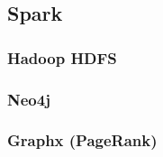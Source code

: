 \subsection{Spark}
\label{sec:spark}

\subsubsection{Hadoop HDFS}
\label{sec:hadoop HDFS}

\subsubsection{Neo4j}
\label{sec:neo4j}

\subsubsection{Graphx (PageRank)}
\label{sec:graphx (PageRank)}
